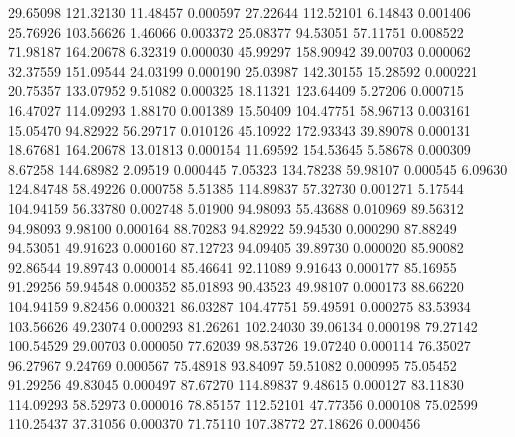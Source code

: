        29.65098      121.32130       11.48457       0.000597
       27.22644      112.52101        6.14843       0.001406
       25.76926      103.56626        1.46066       0.003372
       25.08377       94.53051       57.11751       0.008522
       71.98187      164.20678        6.32319       0.000030
       45.99297      158.90942       39.00703       0.000062
       32.37559      151.09544       24.03199       0.000190
       25.03987      142.30155       15.28592       0.000221
       20.75357      133.07952        9.51082       0.000325
       18.11321      123.64409        5.27206       0.000715
       16.47027      114.09293        1.88170       0.001389
       15.50409      104.47751       58.96713       0.003161
       15.05470       94.82922       56.29717       0.010126
       45.10922      172.93343       39.89078       0.000131
       18.67681      164.20678       13.01813       0.000154
       11.69592      154.53645        5.58678       0.000309
	8.67258      144.68982        2.09519       0.000445
	7.05323      134.78238       59.98107       0.000545
	6.09630      124.84748       58.49226       0.000758
	5.51385      114.89837       57.32730       0.001271
	5.17544      104.94159       56.33780       0.002748
	5.01900       94.98093       55.43688       0.010969
       89.56312       94.98093        9.98100       0.000164
       88.70283       94.82922       59.94530       0.000290
       87.88249       94.53051       49.91623       0.000160
       87.12723       94.09405       39.89730       0.000020
       85.90082       92.86544       19.89743       0.000014
       85.46641       92.11089        9.91643       0.000177
       85.16955       91.29256       59.94548       0.000352
       85.01893       90.43523       49.98107       0.000173
       88.66220      104.94159        9.82456       0.000321
       86.03287      104.47751       59.49591       0.000275
       83.53934      103.56626       49.23074       0.000293
       81.26261      102.24030       39.06134       0.000198
       79.27142      100.54529       29.00703       0.000050
       77.62039       98.53726       19.07240       0.000114
       76.35027       96.27967        9.24769       0.000567
       75.48918       93.84097       59.51082       0.000995
       75.05452       91.29256       49.83045       0.000497
       87.67270      114.89837        9.48615       0.000127
       83.11830      114.09293       58.52973       0.000016
       78.85157      112.52101       47.77356       0.000108
       75.02599      110.25437       37.31056       0.000370
       71.75110      107.38772       27.18626       0.000456
